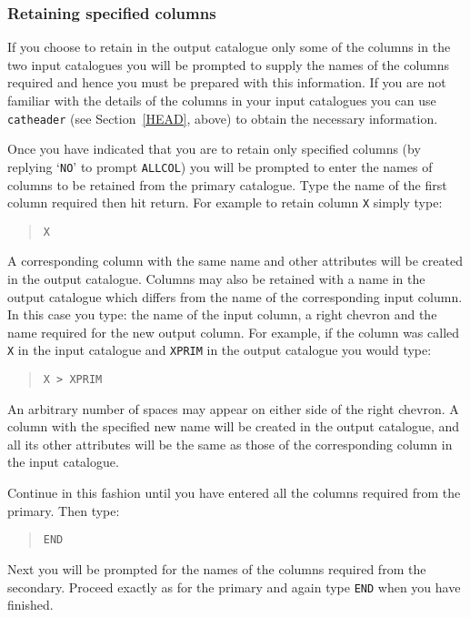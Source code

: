 \documentclass[twoside,11pt]{article}
\renewcommand{\_}{\texttt{\symbol{95}}}
\begin{document}
\subsubsection{\label{PAIR_INP_COL}Retaining specified columns}

If you choose to retain in the output catalogue only some of the columns
in the two input catalogues you will be prompted to supply the names of
the columns required and hence you must be prepared with this information.
If you are not familiar with the details of the columns in your input 
catalogues you can use {\tt catheader} (see Section~\ref{HEAD}, above) to 
obtain the necessary information.

Once you have indicated that you are to retain only specified columns (by
replying `{\tt NO}' to prompt {\tt ALLCOL}) you will be prompted to enter
the names of columns to be retained from the primary catalogue. Type the
name of the first column required then hit return. For example to retain
column {\tt X} simply type:

\begin{verse}
{\tt X}
\end{verse}

A corresponding column with the same name and other attributes will be
created in the output catalogue. Columns may also be retained with a name
in the output catalogue which differs from the name of the corresponding
input column. In this case you type: the name of the input column, a right
chevron and the name required for the new output column. For example, if
the column was called {\tt X} in the input catalogue and {\tt X\_PRIM}
in the output catalogue you would type:

\begin{verse}
{\tt X > X\_PRIM}
\end{verse}

An arbitrary number of spaces may appear on either side of the right
chevron. A column with the specified new name will be created in the
output catalogue, and all its other attributes will be the same as those
of the corresponding column in the input catalogue.

Continue in this fashion until you have entered all the columns required
from the primary.  Then type:

\begin{verse}
{\tt END}
\end{verse}

Next you will be prompted for the names of the columns required from the
secondary. Proceed exactly as for the primary and again type {\tt END}
when you have finished.
\end{document}
